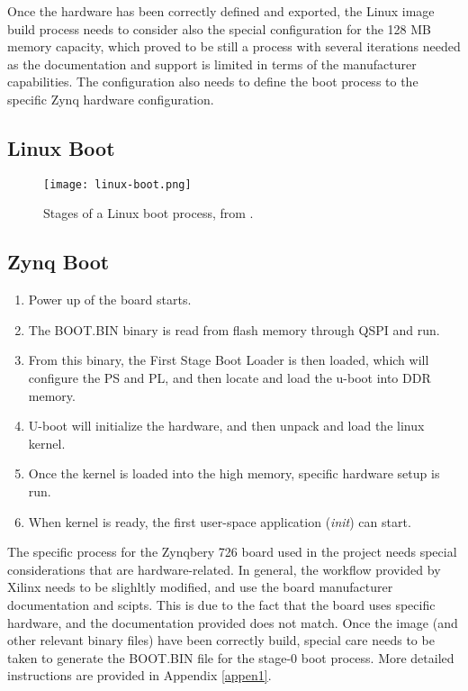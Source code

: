 Once the hardware has been correctly defined and exported, the Linux image build process needs to consider also the special configuration for the 128 MB memory capacity, which proved to be still a process with several iterations needed as the documentation and support is limited in terms of the manufacturer capabilities. The configuration also needs to define the boot process to the specific Zynq hardware configuration.

\subsection{Linux Boot}

\begin{figure}[htp]
	\centering
	\texttt{[image: linux-boot.png]}
	\caption{Stages of a Linux boot process, from \cite{Crokett2014}.} \label{fig:linux-boot}
\end{figure}

\subsection{Zynq Boot}

\begin{enumerate}
	\item Power up of the board starts.
	\item The BOOT.BIN binary is read from flash memory through QSPI and run.
	\item From this binary, the First Stage Boot Loader is then loaded, which will configure the PS and PL, and then locate and load the u-boot into DDR memory.
	\item U-boot will initialize the hardware, and then unpack and load the linux kernel.
	\item Once the kernel is loaded into the high memory, specific hardware setup is run.
	\item When kernel is ready, the first user-space application (\textit{init}) can start.
\end{enumerate}

The specific process for the Zynqbery 726 board used in the project needs special considerations that are hardware-related. In general, the workflow provided by Xilinx needs to be slighltly modified, and use the board manufacturer documentation and scipts. This is due to the fact that the board uses specific hardware, and the documentation provided does not match. Once the image (and other relevant binary files) have been correctly build, special care needs to be taken to generate the BOOT.BIN file for the stage-0 boot process. More detailed instructions are provided in Appendix \ref{appen1}.
